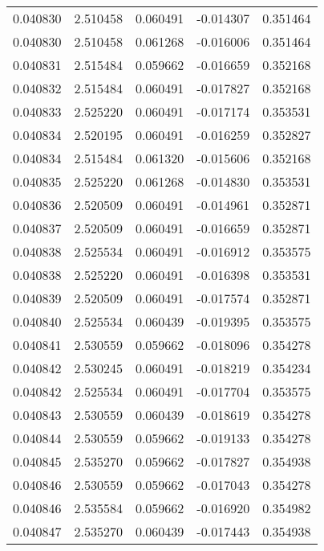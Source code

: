 \begin{tabular}{lrrrr}
0.040830    &  2.510458 &  0.060491 & -0.014307 &             0.351464 \\
0.040830    &  2.510458 &  0.061268 & -0.016006 &             0.351464 \\
0.040831    &  2.515484 &  0.059662 & -0.016659 &             0.352168 \\
0.040832    &  2.515484 &  0.060491 & -0.017827 &             0.352168 \\
0.040833    &  2.525220 &  0.060491 & -0.017174 &             0.353531 \\
0.040834    &  2.520195 &  0.060491 & -0.016259 &             0.352827 \\
0.040834    &  2.515484 &  0.061320 & -0.015606 &             0.352168 \\
0.040835    &  2.525220 &  0.061268 & -0.014830 &             0.353531 \\
0.040836    &  2.520509 &  0.060491 & -0.014961 &             0.352871 \\
0.040837    &  2.520509 &  0.060491 & -0.016659 &             0.352871 \\
0.040838    &  2.525534 &  0.060491 & -0.016912 &             0.353575 \\
0.040838    &  2.525220 &  0.060491 & -0.016398 &             0.353531 \\
0.040839    &  2.520509 &  0.060491 & -0.017574 &             0.352871 \\
0.040840    &  2.525534 &  0.060439 & -0.019395 &             0.353575 \\
0.040841    &  2.530559 &  0.059662 & -0.018096 &             0.354278 \\
0.040842    &  2.530245 &  0.060491 & -0.018219 &             0.354234 \\
0.040842    &  2.525534 &  0.060491 & -0.017704 &             0.353575 \\
0.040843    &  2.530559 &  0.060439 & -0.018619 &             0.354278 \\
0.040844    &  2.530559 &  0.059662 & -0.019133 &             0.354278 \\
0.040845    &  2.535270 &  0.059662 & -0.017827 &             0.354938 \\
0.040846    &  2.530559 &  0.059662 & -0.017043 &             0.354278 \\
0.040846    &  2.535584 &  0.059662 & -0.016920 &             0.354982 \\
0.040847    &  2.535270 &  0.060439 & -0.017443 &             0.354938 \\

\end{tabular}
